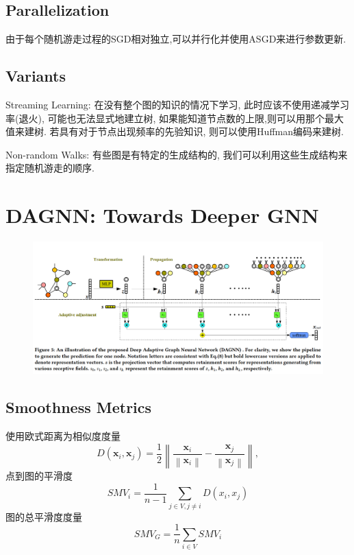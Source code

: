 \documentclass{article}
\begin{document}
\subsection{Parallelization}

由于每个随机游走过程的SGD相对独立,可以并行化并使用ASGD来进行参数更新.

\subsection{Variants}

Streaming Learning: 在没有整个图的知识的情况下学习, 此时应该不使用递减学习率(退火), 可能也无法显式地建立树, 如果能知道节点数的上限,则可以用那个最大值来建树. 若具有对于节点出现频率的先验知识, 则可以使用Huffman编码来建树.

Non-random Walks: 有些图是有特定的生成结构的, 我们可以利用这些生成结构来指定随机游走的顺序.

\section{DAGNN: Towards Deeper GNN}
\begin{figure}[htbp]
    \centering
    \includegraphics[width=0.8\paperwidth]{dagnn-arch.png}
\end{figure}
\subsection{Smoothness Metrics}

使用欧式距离为相似度度量 
\begin{equation}
    D\left(\boldsymbol{x}_{i}, \boldsymbol{x}_{j}\right)=\frac{1}{2}\left\|\frac{\boldsymbol{x}_{i}}{\left\|\boldsymbol{x}_{i}\right\|}-\frac{\boldsymbol{x}_{j}}{\left\|\boldsymbol{x}_{j}\right\|}\right\|,
\end{equation}
点到图的平滑度
\begin{equation}
    S M V_{i}=\frac{1}{n-1} \sum_{j \in V, j \neq i} D\left(x_{i}, x_{j}\right)
\end{equation}
图的总平滑度度量
\begin{equation}
    S M V_{G}=\frac{1}{n} \sum_{i \in V} S M V_{i}
\end{equation}
\end{document}
